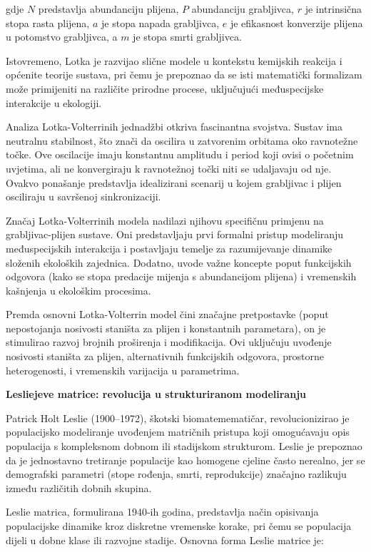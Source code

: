\documentclass[11pt,oneside]{book}
\begin{document}
gdje $N$ predstavlja abundanciju plijena, $P$ abundanciju grabljivca, $r$ je intrinsična stopa rasta plijena, $a$ je stopa napada grabljivca, $e$ je efikasnost konverzije plijena u potomstvo grabljivca, a $m$ je stopa smrti grabljivca.

Istovremeno, Lotka je razvijao slične modele u kontekstu kemijskih reakcija i općenite teorije sustava, pri čemu je prepoznao da se isti matematički formalizam može primijeniti na različite prirodne procese, uključujući međuspecijske interakcije u ekologiji.

Analiza Lotka-Volterrinih jednadžbi otkriva fascinantna svojstva. Sustav ima neutralnu stabilnost, što znači da oscilira u zatvorenim orbitama oko ravnotežne točke. Ove oscilacije imaju konstantnu amplitudu i period koji ovisi o početnim uvjetima, ali ne konvergiraju k ravnotežnoj točki niti se udaljavaju od nje. Ovakvo ponašanje predstavlja idealizirani scenarij u kojem grabljivac i plijen osciliraju u savršenoj sinkronizaciji.

Značaj Lotka-Volterrinih modela nadilazi njihovu specifičnu primjenu na grabljivac-plijen sustave. Oni predstavljaju prvi formalni pristup modeliranju međuspecijskih interakcija i postavljaju temelje za razumijevanje dinamike složenih ekoloških zajednica. Dodatno, uvode važne koncepte poput funkcijskih odgovora (kako se stopa predacije mijenja s abundancijom plijena) i vremenskih kašnjenja u ekološkim procesima.

Premda osnovni Lotka-Volterrin model čini značajne pretpostavke (poput nepostojanja nosivosti staništa za plijen i konstantnih parametara), on je stimulirao razvoj brojnih proširenja i modifikacija. Ovi uključuju uvođenje nosivosti staništa za plijen, alternativnih funkcijskih odgovora, prostorne heterogenosti, i vremenskih varijacija u parametrima.

\textbf{Lesliejeve matrice: revolucija u strukturiranom modeliranju}

Patrick Holt Leslie (1900--1972), škotski biomatemematičar, revolucionizirao je populacijsko modeliranje uvođenjem matričnih pristupa koji omogućavaju opis populacija s kompleksnom dobnom ili stadijskom strukturom. Leslie je prepoznao da je jednostavno tretiranje populacije kao homogene cjeline často nerealno, jer se demografski parametri (stope rođenja, smrti, reprodukcije) značajno razlikuju između različitih dobnih skupina.

Leslie matrica, formulirana 1940-ih godina, predstavlja način opisivanja populacijske dinamike kroz diskretne vremenske korake, pri čemu se populacija dijeli u dobne klase ili razvojne stadije. Osnovna forma Leslie matrice je:
\end{document}
